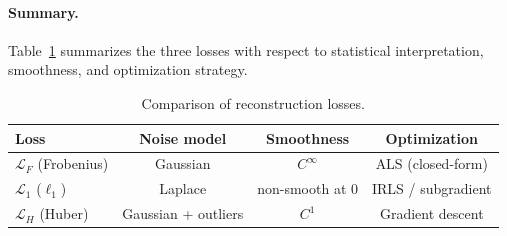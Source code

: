 \paragraph{Summary.}
Table~\ref{tab:losses} summarizes the three losses with respect to
statistical interpretation, smoothness, and optimization strategy.

\begin{table}[h]
  \centering
  \caption{Comparison of reconstruction losses.}
  \label{tab:losses}
  \begin{tabular}{lccc}
    \toprule
    Loss & Noise model & Smoothness & Optimization \\
    \midrule
    $\mathcal{L}_F$ (Frobenius)
      & Gaussian      & $C^\infty$       & ALS (closed-form) \\
    $\mathcal{L}_1$ ($\ell_1$)
      & Laplace       & non-smooth at 0  & IRLS / subgradient \\
    $\mathcal{L}_H$ (Huber)
      & Gaussian + outliers & $C^1$      & Gradient descent \\
    \bottomrule
  \end{tabular}
\end{table}






